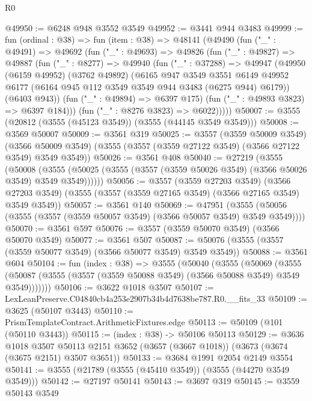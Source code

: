 \begin{lexlean}{R0}
\begin{coremodule}
@49950 := @6248 @948 @3552 @3549
@49952 := @3441 @944 @3483
@49999 := fun (ordinal : @38) =>
  fun (item : @38) =>
  @48141
    (@49490
      (fun ("_" : @49491) =>
      @49692
        (fun ("_" : @49693) =>
        @49826
          (fun ("_" : @49827) =>
          @49887
            (fun ("_" : @8277) =>
            @49940
              (fun ("_" : @37288) =>
              @49947
                (@49950
                  (@6159 @49952)
                  (@3762 @49892)
                  (@6165
                    @947
                    @3549
                    @3551
                    @6149
                    @49952
                    @6177
                    (@6164 @945 @112 @3549 @3549 @944 @3483 (@6275 @944) @6179))
                  (@6403 @943))
                (fun ("_" : @49894) => @6397 @175)
                (fun ("_" : @49893 @3823) => @6397 @184)))
            (fun ("_" : @8276 @3823) => @6022)))))
@50007 := @3555 (@20812 (@3555 (@45123 @3549)) (@3555 (@44145 @3549 @3549)))
@50008 := @3569 @50007
@50009 := @3561 @319
@50025 := @3557
    (@3559 @50009 @3549)
    (@3566 @50009 @3549)
    (@3555 (@3557 (@3559 @27122 @3549) (@3566 @27122 @3549) @3549 @3549))
@50026 := @3561 @408
@50040 := @27219
    (@3555
      (@50008
        (@3555 (@50025 (@3555 (@3557 (@3559 @50026 @3549) (@3566 @50026 @3549) @3549 @3549))))))
@50056 := @3557
    (@3559 @27203 @3549)
    (@3566 @27203 @3549)
    (@3555 (@3557 (@3559 @27165 @3549) (@3566 @27165 @3549) @3549 @3549))
@50057 := @3561 @140
@50069 := @47951
    (@3555 (@50056 (@3555 (@3557 (@3559 @50057 @3549) (@3566 @50057 @3549) @3549 @3549))))
@50070 := @3561 @597
@50076 := @3557 (@3559 @50070 @3549) (@3566 @50070 @3549)
@50077 := @3561 @507
@50087 := @50076 (@3555 (@3557 (@3559 @50077 @3549) (@3566 @50077 @3549) @3549 @3549))
@50088 := @3561 @604
@50104 := fun (index : @38) =>
  @3555
    (@50040
      (@3555
        (@50069
          (@3555 (@50087 (@3555 (@3557 (@3559 @50088 @3549) (@3566 @50088 @3549) @3549 @3549)))))))
@50106 := @3622 @1018 @3507
@50107 := LexLeanPreserve.C04840cb4a253e2907b34b4d7638be787.R0.__fits_33
@50109 := @3625 (@50107 @3443)
@50110 := PrismTemplateContract.ArithmeticFixtures.edge
@50113 := @50109 (@101 (@50110 @3443))
@50115 := (index : @38) -> @50106 @50113
@50129 := @3636
    @1018
    @3507
    @50113
    @2151
    @3652
    (@3657 (@3667 @1018))
    (@3673 (@3674 (@3675 @2151) @3507 @3651))
@50133 := @3684 @1991 @2054 @2149 @3554
@50141 := @3555 (@21789 (@3555 (@45410 @3549)) (@3555 (@44270 @3549 @3549)))
@50142 := @27197 @50141
@50143 := @3697 @319
@50145 := @3559 @50143 @3549

\end{coremodule}
\end{lexlean}
